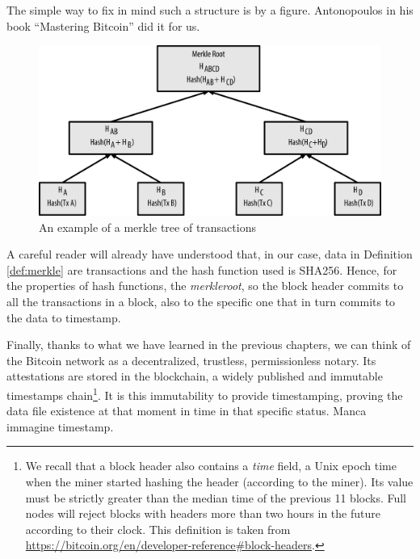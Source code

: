 \bigskip
\noindent
The simple way to fix in mind such a structure is by a figure. Antonopoulos in his book \enquote{Mastering Bitcoin} \cite{Antonopoulos:2017:MBP:3164842} did it for us.

\begin{figure}[ht]
    \centering
	\includegraphics[width=0.9\linewidth]{Images/merkle-tree.png}
	\caption{An example of a merkle tree of transactions}
	\label{fig:merkle}
\end{figure}

\bigskip
\noindent
A careful reader will already have understood that, in our case, data in Definition \ref{def:merkle} are transactions and the hash function used  is SHA256. Hence, for the properties of hash functions, the \textit{merkleroot}, so the block header commits to all the transactions in a block, also to the specific one that in turn commits to the data to timestamp. 

\bigskip
\noindent
Finally, thanks to what we have learned in the previous chapters, we can think of the Bitcoin network as a decentralized, trustless, permissionless notary. Its attestations are stored in the blockchain, a widely published and immutable timestamps chain\footnote{We recall that a block header also contains a \textit{time} field, a Unix epoch time when the miner started hashing the header (according to the miner). Its value must be strictly greater than the median time of the previous 11 blocks. Full nodes will reject blocks with headers more than two hours in the future according to their clock. This definition is taken from \url{https://bitcoin.org/en/developer-reference\#block-headers}.}. It is this immutability to provide timestamping, proving the data file existence at that moment in time in that specific status. Manca immagine timestamp.

